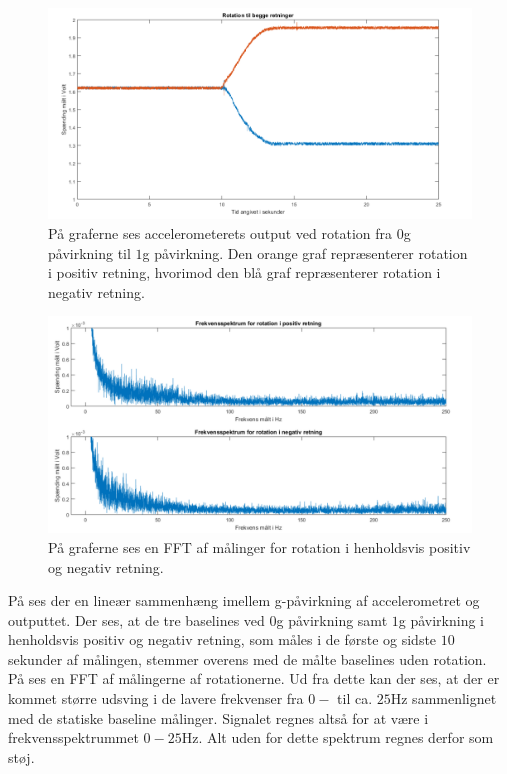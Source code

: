 \begin{figure}[H]
	\centering
	\includegraphics[scale=0.45]{figures/cProblemloesning/Pilotforsoeg_Rotation.png}
	\caption{På graferne ses accelerometerets output ved rotation fra $0$g påvirkning til $1$g påvirkning. Den orange graf repræsenterer rotation i positiv retning, hvorimod den blå graf repræsenterer rotation i negativ retning.}
	\label{Fig:Pilot_Rottid}
\end{figure}
\begin{figure}[H]
	\centering
	\includegraphics[scale=0.5]{figures/cProblemloesning/Pilotforsoeg_RotationFrekvens.png}
	\caption{På graferne ses en FFT af målinger for rotation i henholdsvis positiv og negativ retning.}
	\label{Fig:Pilot_Rotfrek}
\end{figure}
På  ses der en lineær sammenhæng imellem g-påvirkning af accelerometret og outputtet. Der ses, at de tre baselines ved $0$g påvirkning samt $1$g påvirkning i henholdsvis positiv og negativ retning, som måles i de første og sidste $10$ sekunder af målingen, stemmer overens med de målte baselines uden rotation. \\
På  ses en FFT af målingerne af rotationerne. Ud fra dette kan der ses, at der er kommet større udsving i de lavere frekvenser fra $0-$ til ca. $25$Hz sammenlignet med de statiske baseline målinger. Signalet regnes altså for at være i frekvensspektrummet $0-25$Hz. Alt uden for dette spektrum regnes derfor som støj.

